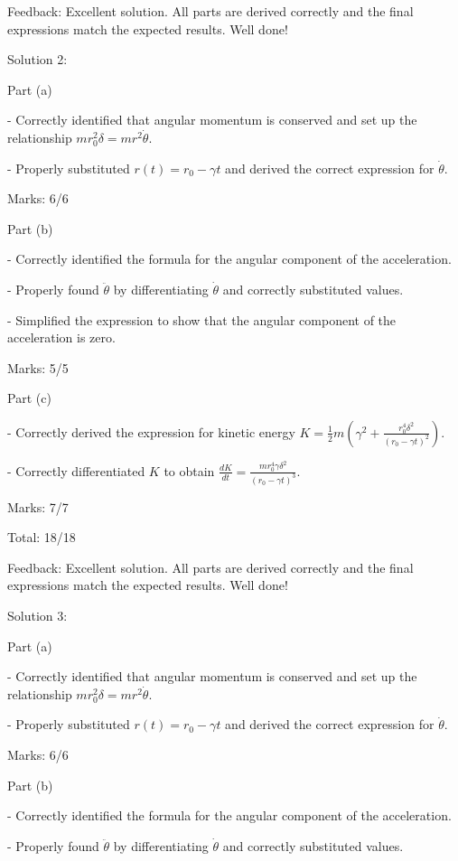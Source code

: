 \documentclass[a4paper,11pt]{article}
\begin{document}
Feedback: Excellent solution. All parts are derived correctly and the final expressions match the expected results. Well done!

Solution 2:

Part (a)

- Correctly identified that angular momentum is conserved and set up the relationship \( m r_0^2 \delta = m r^2 \dot{\theta} \).

- Properly substituted \( r(t) = r_0 - \gamma t \) and derived the correct expression for \( \dot{\theta} \).

Marks: 6/6

Part (b)

- Correctly identified the formula for the angular component of the acceleration.

- Properly found \( \ddot{\theta} \) by differentiating \( \dot{\theta} \) and correctly substituted values.

- Simplified the expression to show that the angular component of the acceleration is zero.

Marks: 5/5

Part (c)

- Correctly derived the expression for kinetic energy \( K = \frac{1}{2}m (\gamma^2 + \frac{r_0^4 \delta^2}{(r_0 - \gamma t)^2}) \).

- Correctly differentiated \( K \) to obtain \( \frac{dK}{dt} = \frac{m r_0^4 \gamma \delta^2}{(r_0 - \gamma t)^3} \).

Marks: 7/7

Total: 18/18

Feedback: Excellent solution. All parts are derived correctly and the final expressions match the expected results. Well done!

Solution 3:

Part (a)

- Correctly identified that angular momentum is conserved and set up the relationship \( m r_0^2 \delta = m r^2 \dot{\theta} \).

- Properly substituted \( r(t) = r_0 - \gamma t \) and derived the correct expression for \( \dot{\theta} \).

Marks: 6/6

Part (b)

- Correctly identified the formula for the angular component of the acceleration.

- Properly found \( \ddot{\theta} \) by differentiating \( \dot{\theta} \) and correctly substituted values.
\end{document}
